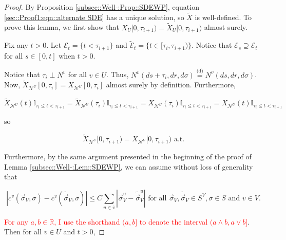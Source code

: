 \documentclass[12pt]{article}
\newcommand{\mb}{\mathbb}
\newcommand{\mc}{\mathcal}
\newcommand{\ov}{\overline}
\newcommand{\te}{\text}
\newcommand{\tr}{\textcolor{red}}
\newcommand{\ind}{\hspace{24pt}}
\newcommand{\deq}{\overset{\text{(d)}}{=}}			%
\renewcommand{\v}{v}							%
\newcommand{\vv}{u}								%
\renewcommand{\U}{U}							%
\renewcommand{\S}{S}							%
\newcommand{\s}{\sigma}							%
\newcommand{\sv}{\vec{\s}}						%
\renewcommand{\t}{t}							%
\renewcommand{\tt}{s}							%
\newcommand{\X}{X}								%
\newcommand{\IGr}{c}							%
\newcommand{\neigh}{\mc{N}}						%
\newcommand{\vind}[1]{^{#1}}					%
\newcommand{\carp}[1]{^{#1}}					%
\newcommand{\vsi}[1]{^{#1}}						%
\newcommand{\cind}[1]{_{#1}}					%
\newcommand{\cl}{\ov}							%
\newcommand{\tp}[1]{(#1)}						%
\newcommand{\tip}[1]{#1}						%
\newcommand{\ts}[1]{_{#1}}						%
\newcommand{\const}{C}							%
\newcommand{\poiss}{N}							%
\newcommand{\alt}[1]{\widetilde{#1}}			%
\newcommand{\indx}[1]{_{#1}}					%
\newcommand{\rt}{\tau}							%
\newcommand{\evnt}{\mc{E}}						%
\begin{document}
\begin{proof}
\ind By Proposition \ref{subsec::Well-:Prop::SDEWP}, equation \eqref{sec::Proof1:eqn::alternate SDE} has a unique solution, so \(\alt{\X}\) is well-defined. To prove this lemma, we first show that \(\X\cind{\U}\tip{[0,\rt\indx{i+1})} = \alt{\X}\cind{\U}{[0,\rt\indx{i+1})}\) almost surely. 

\ind Fix any \(\t > 0\). Let \(\evnt\ts{\t} = \{\t < \rt\indx{i+1}\}\) and \(\alt{\evnt}\ts{\t} = \{\t\in [\rt\indx{i},\rt\indx{i+1})\}\). Notice that \(\evnt\ts{\tt} \supseteq \evnt\ts{\t}\) for all \(\tt\in [0,\t]\) when \(\t > 0\). 

\ind Notice that \(\rt\indx{i} \perp \poiss\vind{\v}\) for all \(\v \in \U\). Thus, \(\poiss\vind{\v}(d\tt+\rt\indx{i},dr,d\s) \deq \poiss\vind{\v}(d\tt,dr,d\s)\). Now, \(\alt{\X}\cind{\neigh\vind{\U}}\tip{[0,\rt\indx{i}]} = \X\cind{\neigh\vind{\U}}\tip{[0,\rt\indx{i}]}\) almost surely by definition. Furthermore,

\[\alt{\X}\cind{\neigh\vind{\U}}\tp{\t}\mb{I}_{\rt\indx{i}\leq \t < \rt\indx{i+1}} = \alt{\X}\cind{\neigh\vind{\U}}\tp{\rt\indx{i}}\mb{I}_{\rt\indx{i}\leq \t < \rt\indx{i+1}} = \X\cind{\neigh\vind{\U}}\tp{\rt\indx{i}}\mb{I}_{\rt\indx{i}\leq \t < \rt\indx{i+1}} = \X\cind{\neigh\vind{\U}}\tp{\t}\mb{I}_{\rt\indx{i}\leq \t < \rt\indx{i+1}}\]

so

\[\alt{\X}\cind{\neigh\vind{\U}}\tip{[0,\rt\indx{i+1})} = \X\cind{\neigh\vind{\U}}\tip{[0,\rt\indx{i+1})} \te{ a.t.}\]

Furthermore, by the same argument presented in the beginning of the proof of Lemma \ref{subsec::Well-:Lem::SDEWP}, we can assume without loss of generality that 

\[|\IGr\vind{\v}(\sv\cind{V},\s) - \IGr\vind{\v}(\alt{\sv}\cind{V},\s)| \leq \const\sum_{\vv\in \cl{\v}} |\sv\cind{V}\vsi{\vv} - \alt{\sv}\cind{V}\vsi{\vv}|\te{ for all } \sv\cind{V},\alt{\sv}\cind{V}\in \S\carp{V},\s \in \S \te{ and } \v \in V.\]

\tr{For any \(a,b\in \mb{R}\), I use the shorthand \((a,b]\) to denote the interval \((a\wedge b,a\vee b]\)}. Then for all \(v\in \U\) and \(\t > 0\),


\end{proof}
\end{document}
